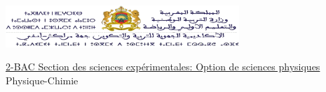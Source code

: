 \documentclass[12pt]{article}
\newcommand\headerMe[2]{\noindent{}#1\hfill#2}
\begin{document}
\begin{center}


	\includegraphics[width=0.66\textwidth]{./img/logo_arefmsoct2021.png}
\end{center}


\begin{center}
\underline{2-BAC Section des sciences expérimentales: Option de sciences physiques}\\

    \vspace{.2cm}
\hrulefill
\Large{Physique-Chimie}
\hrulefill\\
\end{center}
\end{document}
